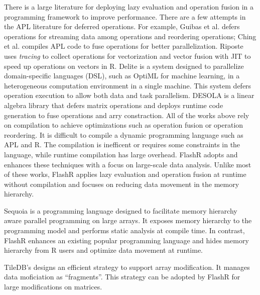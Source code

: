 There is a large literature for deploying lazy evaluation and operation fusion
in a programming framework to improve performance. There are a few attempts
in the APL literature for deferred operations. For example, Guibas et al.
\cite{Guibas78} defers operations for streaming data among operations and
reordering operations; Ching et al. \cite{Ching12} compiles APL code
to fuse operations for better parallelization. Riposte \cite{riposte} uses
\textit{tracing} to collect operations for vectorization and vector fusion
with JIT to speed up operations on vectors in R.
Delite \cite{delite} is a system designed to parallelize domain-specific languages
(DSL), such as OptiML \cite{optiml} for machine learning, in a heterogeneous
computation environment in a single machine. This system
defers operation execution to allow both data and task parallelism.
DESOLA \cite{desola} is a linear algebra library that defers matrix operations
and deploys runtime code generation to fuse operations and arry constraction.
All of the works above rely on compilation to achieve optimizations such as
operation fusion or operation reordering.
It is difficult to compile a dynamic programming language such as APL and R.
The compilation is inefficent or requires some constraints in the language,
while runtime compilation has large overhead.
FlashR adopts and enhances these techniques with a focus on large-scale
data analysis. Unlike most of these works, FlashR applies lazy evaluation
and operation fusion at runtime without compilation and focuses on reducing
data movement in the memory hierarchy.


Sequoia \cite{sequoia} is a programming language designed to facilitate
memory hierarchy aware parallel programming on large arrays.
It exposes memory hierarchy to the programming model and performs static
analysis at compile time. In contrast, FlashR enhances an existing popular
programming language and hides memory
hierarchy from R users and optimize data movement at runtime.

TileDB's \cite{Papadopoulos16} designs an efficient strategy to support
array modification.
It manages data moficiation as ``fragments''. This strategy can be adopted by
FlashR for large modifications on matrices.
